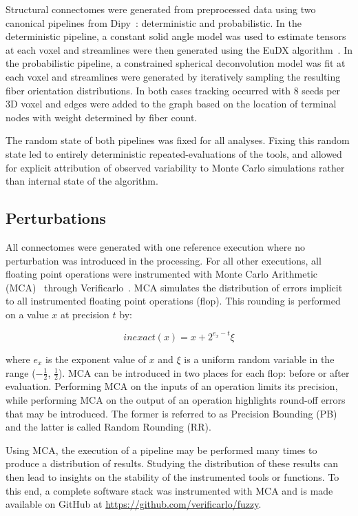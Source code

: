 \documentclass[fleqn,10pt]{SelfArx} %
\newcommand{\new}[1]{{\color{blue} #1}}
\begin{document}
Structural connectomes were generated from preprocessed data using two canonical pipelines from
Dipy~\cite{Garyfallidis2014-ql}: deterministic and probabilistic. In the deterministic pipeline, a constant solid angle
model was used to estimate tensors at each voxel and streamlines were then generated using the EuDX
algorithm~\cite{Garyfallidis2012-gg}. In the probabilistic pipeline, a constrained spherical deconvolution model was
fit at each voxel and streamlines were generated by iteratively sampling the resulting fiber orientation distributions.
In both cases tracking occurred with $8$ seeds per 3D voxel and edges were added to the graph based on the location of
terminal nodes with weight determined by fiber count.

The random state of \new{both} pipelines was fixed for all analyses. Fixing this random \new{state led to entirely
deterministic repeated-evaluations of the tools}, and allowed for explicit
attribution of observed variability to Monte Carlo simulations rather than internal state of the algorithm.

\subsection*{Perturbations}
All connectomes were generated with one reference execution where no perturbation was introduced in the processing. For
all other executions, all floating point operations were instrumented with Monte Carlo Arithmetic
(MCA)~\cite{Parker1997-qq} through Verificarlo~\cite{Denis2016-wo}. MCA simulates the distribution of errors implicit
to all instrumented floating point operations (flop). This rounding is performed on a value $x$ at precision $t$ by:

\begin{equation}
inexact(x) = x + 2^{e_x - t}\xi 
\label{eq:inexact}
\end{equation}

where $e_x$ is the exponent value of $x$ and $\xi$ is a uniform random variable in the range ($-\frac{1}{2}$,
$\frac{1}{2}$). MCA can be introduced in two places for each flop: before or after evaluation. Performing MCA on the
inputs of an operation limits its precision, while performing MCA on the output of an operation highlights round-off
errors that may be introduced. The former is referred to as Precision Bounding (PB) and the latter is called Random
Rounding (RR).

Using MCA, the execution of a pipeline may be performed many times to produce a distribution of results. Studying the
distribution of these results can then lead to insights on the stability of the instrumented tools or functions. To
this end, a complete software stack was instrumented with MCA and is made available on GitHub at
\url{https://github.com/verificarlo/fuzzy}.
\end{document}
